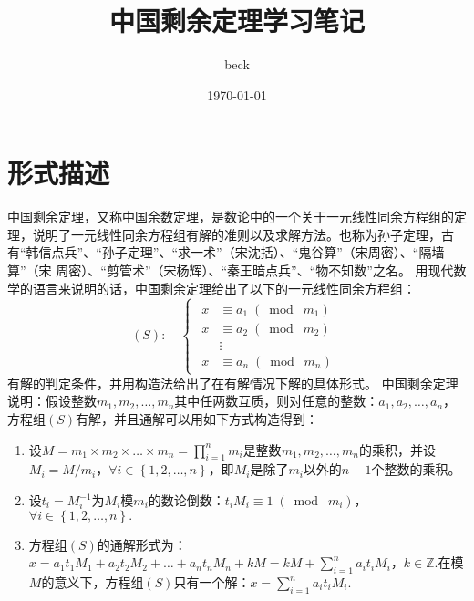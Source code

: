 \documentclass[UTF8]{ctexart}
\title{中国剩余定理学习笔记}
\author{beck}
\date{\today}s
\begin{document}
\maketitle
\section*{形式描述}
中国剩余定理，又称中国余数定理，是数论中的一个关于一元线性同余方程组的定理，说明了一元线性同余方程组有解的准则以及求解方法。也称为孙子定理，古有“韩信点兵”、“孙子定理”、“求一术”（宋沈括）、“鬼谷算”（宋周密）、“隔墙算”（宋 周密）、“剪管术”（宋杨辉）、“秦王暗点兵”、“物不知数”之名。
用现代数学的语言来说明的话，中国剩余定理给出了以下的一元线性同余方程组：
\[
    (S):\quad
    \begin{cases}
        \begin{aligned}
            x & \equiv a_1 \;(\bmod\;m_1) \\
            x & \equiv a_2 \;(\bmod\;m_2) \\
            & \vdots \\
            x & \equiv a_n \;(\bmod\;m_n)
        \end{aligned}
    \end{cases}
\]
有解的判定条件，并用构造法给出了在有解情况下解的具体形式。
中国剩余定理说明：假设整数$m_1,m_2,\ldots,m_n$其中任两数互质，则对任意的整数：$a_1,a_2,\ldots,a_n$，方程组$(S)$有解，并且通解可以用如下方式构造得到：
\begin{enumerate}[1.]
    \item 设$M = m_1 \times m_2 \times \ldots \times m_n = {\displaystyle \prod_{i=1}^n m_i}$是整数$m_1,m_2,\ldots,m_n$的乘积，并设$M_i=M/m_i$，$\forall i \in \left\{1,2,\ldots,n\right\}$，即$M_i$是除了$m_i$以外的$n - 1$个整数的乘积。
    \item 设$t_i = M_i^{-1}$为$M_i$模$m_i$的数论倒数：$t_iM_i \equiv 1\;(\bmod\;m_i)$，$\forall i \in \left\{1,2,\ldots,n\right\}.$
    \item 方程组$(S)$的通解形式为：$x = a_1t_1M_1 + a_2t_2M_2 + \ldots + a_nt_nM_n + kM = kM + {\displaystyle \sum_{i=1}^n a_it_iM_i}$，$k \in \mathbb{Z}.$在模$M$的意义下，方程组$(S)$只有一个解：$x = {\displaystyle \sum_{i=1}^n a_it_iM_i}.$
\end{enumerate}
\end{document}
